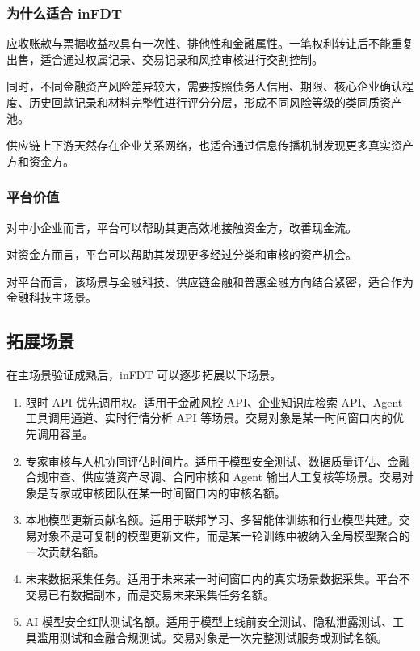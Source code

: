 \documentclass[UTF8,a4paper,12pt]{ctexart}
\begin{document}
\subsubsection*{为什么适合 inFDT}

应收账款与票据收益权具有一次性、排他性和金融属性。一笔权利转让后不能重复出售，适合通过权属记录、交易记录和风控审核进行交割控制。

同时，不同金融资产风险差异较大，需要按照债务人信用、期限、核心企业确认程度、历史回款记录和材料完整性进行评分分层，形成不同风险等级的类同质资产池。

供应链上下游天然存在企业关系网络，也适合通过信息传播机制发现更多真实资产方和资金方。

\subsubsection*{平台价值}

对中小企业而言，平台可以帮助其更高效地接触资金方，改善现金流。

对资金方而言，平台可以帮助其发现更多经过分类和审核的资产机会。

对平台而言，该场景与金融科技、供应链金融和普惠金融方向结合紧密，适合作为金融科技主场景。

\subsection{拓展场景}

在主场景验证成熟后，inFDT 可以逐步拓展以下场景。

\begin{enumerate}
    \item 限时 API 优先调用权。适用于金融风控 API、企业知识库检索 API、Agent 工具调用通道、实时行情分析 API 等场景。交易对象是某一时间窗口内的优先调用容量。
    \item 专家审核与人机协同评估时间片。适用于模型安全测试、数据质量评估、金融合规审查、供应链资产尽调、合同审核和 Agent 输出人工复核等场景。交易对象是专家或审核团队在某一时间窗口内的审核名额。
    \item 本地模型更新贡献名额。适用于联邦学习、多智能体训练和行业模型共建。交易对象不是可复制的模型更新文件，而是某一轮训练中被纳入全局模型聚合的一次贡献名额。
    \item 未来数据采集任务。适用于未来某一时间窗口内的真实场景数据采集。平台不交易已有数据副本，而是交易未来采集任务名额。
    \item AI 模型安全红队测试名额。适用于模型上线前安全测试、隐私泄露测试、工具滥用测试和金融合规测试。交易对象是一次完整测试服务或测试名额。
\end{enumerate}
\end{document}
